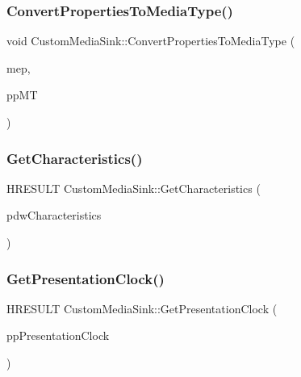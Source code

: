 \mbox{\label{class_custom_media_sink_a18b75362a764a1a4c110d8275f4f88c7}} 
\subsubsection{\texorpdfstring{Convert\+Properties\+To\+Media\+Type()}{ConvertPropertiesToMediaType()}}
{\footnotesize\ttfamily void Custom\+Media\+Sink\+::\+Convert\+Properties\+To\+Media\+Type (\begin{DoxyParamCaption}\item[{A\+B\+I\+::\+Windows\+::\+Media\+::\+Media\+Properties\+::\+I\+Media\+Encoding\+Properties $\ast$}]{mep,  }\item[{I\+M\+F\+Media\+Type $\ast$$\ast$}]{pp\+MT }\end{DoxyParamCaption})}

\mbox{\label{class_custom_media_sink_a3371c3cd571170eda3eae3c943b0be54}} 
\subsubsection{\texorpdfstring{Get\+Characteristics()}{GetCharacteristics()}}
{\footnotesize\ttfamily H\+R\+E\+S\+U\+LT Custom\+Media\+Sink\+::\+Get\+Characteristics (\begin{DoxyParamCaption}\item[{D\+W\+O\+RD $\ast$}]{pdw\+Characteristics }\end{DoxyParamCaption})\hspace{0.3cm}{\ttfamily [override]}}

\mbox{\label{class_custom_media_sink_a1ec4f87cc525d122284f7e5952d6718e}} 
\subsubsection{\texorpdfstring{Get\+Presentation\+Clock()}{GetPresentationClock()}}
{\footnotesize\ttfamily H\+R\+E\+S\+U\+LT Custom\+Media\+Sink\+::\+Get\+Presentation\+Clock (\begin{DoxyParamCaption}\item[{I\+M\+F\+Presentation\+Clock $\ast$$\ast$}]{pp\+Presentation\+Clock }\end{DoxyParamCaption})\hspace{0.3cm}{\ttfamily [override]}}

